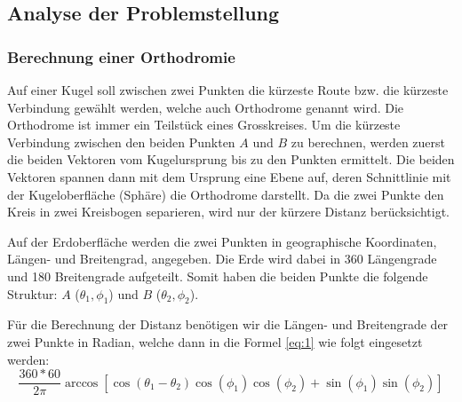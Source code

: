 \subsection{Analyse der Problemstellung}
\subsubsection{Berechnung einer Orthodromie}
Auf einer Kugel soll zwischen zwei Punkten die kürzeste Route bzw. die kürzeste
Verbindung gewählt werden, welche auch Orthodrome genannt wird. Die Orthodrome
ist immer ein Teilstück eines Grosskreises. Um die kürzeste Verbindung
zwischen den beiden Punkten $A$ und $B$ zu berechnen, werden zuerst die beiden
Vektoren vom Kugelursprung bis zu den Punkten ermittelt. Die beiden Vektoren
spannen dann mit dem Ursprung eine Ebene auf, deren Schnittlinie mit der
Kugeloberfläche (Sphäre) die Orthodrome darstellt. Da die zwei Punkte den Kreis
in zwei Kreisbogen separieren, wird nur der kürzere Distanz berücksichtigt.


Auf der Erdoberfläche werden die zwei Punkten in geographische Koordinaten,
Längen- und Breitengrad, angegeben. Die Erde wird dabei in 360 Längengrade und
180 Breitengrade aufgeteilt. Somit haben die beiden Punkte die folgende
Struktur: $A$ (\(\theta_1 , \phi_1\)) und $B$ (\(\theta_2 , \phi_2\)).

Für die Berechnung der Distanz benötigen wir die Längen- und Breitengrade der
zwei Punkte in Radian, welche dann in die Formel \eqref{eq:1} wie folgt
eingesetzt werden: \\
\begin{equation}
\label{eq:1}
 \frac{360*60}{2 \pi} \arccos[\cos(\theta_1 - \theta_2) \cos(\phi_1) \cos(\phi_2)+\sin(\phi_1) \sin(\phi_2)]
 \end{equation}




